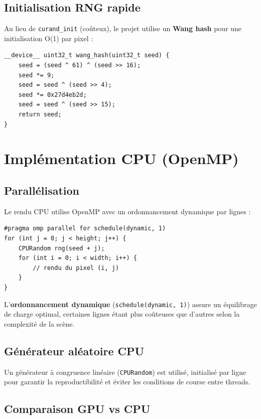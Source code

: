 \documentclass[12pt,a4paper]{article}
\begin{document}
\subsection{Initialisation RNG rapide}

Au lieu de \texttt{curand\_init} (coûteux), le projet utilise un
\textbf{Wang hash} pour une initialisation O(1) par pixel :

\begin{lstlisting}[caption={Wang hash pour l'initialisation RNG}]
__device__ uint32_t wang_hash(uint32_t seed) {
    seed = (seed ^ 61) ^ (seed >> 16);
    seed *= 9;
    seed = seed ^ (seed >> 4);
    seed *= 0x27d4eb2d;
    seed = seed ^ (seed >> 15);
    return seed;
}
\end{lstlisting}

\section{Implémentation CPU (OpenMP)}

\subsection{Parallélisation}

Le rendu CPU utilise OpenMP avec un ordonnancement dynamique par lignes :

\begin{lstlisting}[caption={Parallélisation OpenMP}]
#pragma omp parallel for schedule(dynamic, 1)
for (int j = 0; j < height; j++) {
    CPURandom rng(seed + j);
    for (int i = 0; i < width; i++) {
        // rendu du pixel (i, j)
    }
}
\end{lstlisting}

L'\textbf{ordonnancement dynamique} (\texttt{schedule(dynamic, 1)}) assure un
équilibrage de charge optimal, certaines lignes étant plus coûteuses que d'autres
selon la complexité de la scène.

\subsection{Générateur aléatoire CPU}

Un générateur à congruence linéaire (\texttt{CPURandom}) est utilisé,
initialisé par ligne pour garantir la reproductibilité et éviter les
conditions de course entre threads.

\subsection{Comparaison GPU vs CPU}
\end{document}
